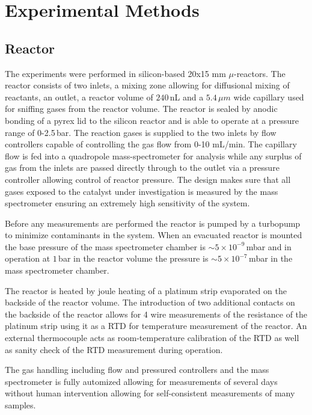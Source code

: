 \documentclass[8.5pt,twoside,twocolumn]{article}
\begin{document}
\section{Experimental Methods}
\subsection{Reactor}
The experiments were performed in silicon-based 20x15 mm $\mu$-reactors\cite{Henriksen2009}. The reactor consists of two inlets, a mixing zone allowing for diffusional mixing of reactants, an outlet, a reactor volume of $240\,$nL and a $5.4\,\mu m$ wide capillary used for sniffing gases from the reactor volume. The reactor is sealed by anodic bonding of a pyrex lid to the silicon reactor and is able to operate at a pressure range of 0-2.5\,bar. The reaction gases is supplied to the two inlets by flow controllers capable of controlling the gas flow from 0-10 mL/min. The capillary flow is fed into a quadropole mass-spectrometer for analysis while any surplus of gas from the inlets are passed directly through to the outlet via a pressure controller allowing control of reactor pressure. The design makes sure that all gases exposed to the catalyst under investigation is measured by the mass spectrometer ensuring an extremely high sensitivity of the system. 

Before any measurements are performed the reactor is pumped by a turbopump to minimize contaminants in the system. When an evacuated reactor is mounted the base pressure of the mass spectrometer chamber is $\sim5\times10^{-9}\,$mbar and in operation at $1\,$bar in the reactor volume the pressure is $\sim5\times10^{-7}\,$mbar in the mass spectrometer chamber. 

The reactor is heated by joule heating of a platinum strip evaporated on the backside of the reactor volume. The introduction of two additional contacts on the backside of the reactor allows for 4 wire measurements of the resistance of the platinum strip using it as a RTD for temperature measurement of the reactor. An external thermocouple acts as room-temperature calibration of the RTD as well as sanity check of the RTD measurement during operation.

The gas handling including flow and pressured controllers and the mass spectrometer is fully automized allowing for measurements of several days without human intervention allowing for self-consistent measurements of many samples.
\end{document}
